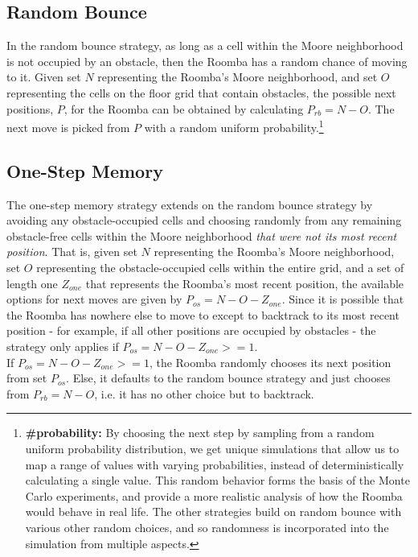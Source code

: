 \documentclass[11pt]{article}
\begin{document}
\subsection{Random Bounce}

In the random bounce strategy, as long as a cell within the Moore
neighborhood is not occupied by an obstacle, then the Roomba has a
random chance of moving to it. Given set \(N\) representing the Roomba's
Moore neighborhood, and set \(O\) representing the cells on the floor
grid that contain obstacles, the possible next positions, \(P\), for the
Roomba can be obtained by calculating \(P_{rb} = N - O\). The next move
is picked from \(P\) with a random uniform probability.\footnote{\textbf{\#probability:} By choosing the next step by sampling from a random uniform probability distribution, we get unique simulations that allow us to map a range of values with varying probabilities, instead of deterministically calculating a single value. This random behavior forms the basis of the Monte Carlo experiments, and provide a more realistic analysis of how the Roomba would behave in real life. The other strategies build on random bounce with various other random choices, and so randomness is incorporated into the simulation from multiple aspects.}

\subsection{One-Step Memory}

The one-step memory strategy extends on the random bounce strategy by
avoiding any obstacle-occupied cells and choosing randomly from any
remaining obstacle-free cells within the Moore neighborhood \emph{that
were not its most recent position}. That is, given set \(N\)
representing the Roomba's Moore neighborhood, set \(O\) representing the
obstacle-occupied cells within the entire grid, and a set of length one
\(Z_{one}\) that represents the Roomba's most recent position, the
available options for next moves are given by
\(P_{os} = N - O - Z_{one}\). Since it is possible that the Roomba has
nowhere else to move to except to backtrack to its most recent position
- for example, if all other positions are occupied by obstacles - the
strategy only applies if \(P_{os} = N - O - Z_{one} >= 1\).\\

If \(P_{os} = N - O - Z_{one} >= 1\), the Roomba randomly chooses its
next position from set \(P_{os}\). Else, it defaults to the random
bounce strategy and just chooses from \(P_{rb} = N - O\), i.e. it has no
other choice but to backtrack.\\
\end{document}
